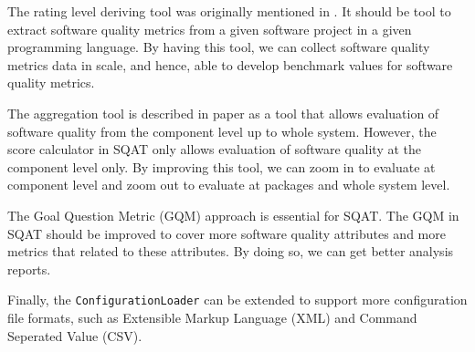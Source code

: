 The rating level deriving tool was originally mentioned in \cite{washizaki2007framework}. It should be tool to extract software quality metrics from a given software project in a given programming language. By having this tool, we can collect software quality metrics data in scale, and hence, able to develop benchmark values for software quality metrics. 

The aggregation tool is described in \cite{washizaki2007framework} paper as a tool that allows evaluation of software quality from the component level up to whole system. However, the score calculator in SQAT only allows evaluation of software quality at the component level only. By improving this tool, we can zoom in to evaluate at component level and zoom out to evaluate at packages and whole system level. 

The Goal Question Metric (GQM) approach is essential for SQAT. The GQM in SQAT should be improved to cover more software quality attributes and more metrics that related to these attributes. By doing so, we can get better analysis reports. 

Finally, the \verb|ConfigurationLoader| can be extended to support more configuration file formats, such as Extensible Markup Language (XML) and Command Seperated Value (CSV).